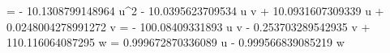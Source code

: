  = - 10.1308799148964 u^{2} - 10.0395623709534 u v + 10.0931607309339 u + 0.0248004278991272 v
 = - 100.08409331893 u v - 0.253703289542935 v + 110.116064087295 w
 = 0.999672870336089 u - 0.999566839085219 w
